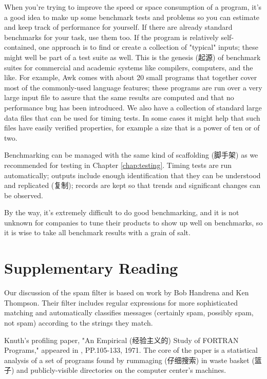 When you're trying to improve the speed or space consumption of a program,
it's a good idea to make up some benchmark tests and problems so you can
estimate and keep track of performance for yourself. If there are already
standard benchmarks for your task, use them too. If the program is
relatively self-contained, one approach is to find or create a collection
of "typical" inputs; these might well be part of a test suite as well. This
is the genesis (起源) of benchmark suites for commercial and academic
systems like compilers, computers, and the like. For example, Awk comes
with about 20 small programs that together cover most of the commonly-used
language features; these programs are run over a very large input file to
assure that the same results are computed and that no performance bug has
been introduced. We also have a collection of standard large data files
that can be used for timing tests. In some cases it might help that such
files have easily verified properties, for example a size that is a power
of ten or of two.

Benchmarking can be managed with the same kind of scaffolding (脚手架) as
we recommended for testing in Chapter \ref{chap:testing}. Timing tests are
run automatically; outputs include enough identification that they can be
understood and replicated (复制); records are kept so that trends and
significant changes can be observed.

By the way, it's extremely difficult to do good benchmarking, and it is not
unknown for companies to tune their products to show up well on benchmarks,
so it is wise to take all benchmark results with a grain of salt.

\section*{Supplementary Reading}
Our discussion of the spam filter is based on work by Bob Handrena and Ken
Thompson. Their filter includes regular expressions for more sophisticated
matching and automatically classifies messages (certainly spam, possibly
spam, not spam) according to the strings they match.

Knuth's profiling paper, "An Empirical (经验主义的) Study of FORTRAN
Programs," appeared in ,
PP.105-133, 1971. The core of the paper is a statistical analysis of a set
of programs found by rummaging (仔细搜索) in waste basket (篮子) and
publicly-visible directories on the computer center's machines.

